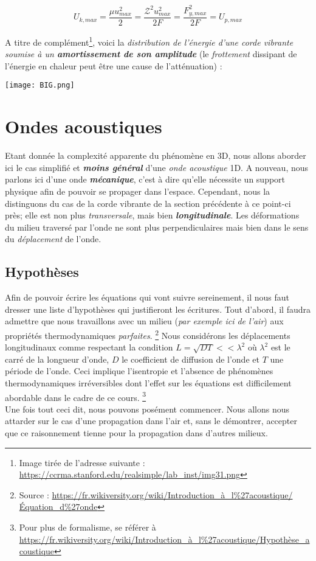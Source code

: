 \[ U_{k,max} = \frac{\mu u_{max}^{2}}{2} =   \frac{\mathcal{Z}^{2} u_{max}^{2}}{2F} = \frac{F_{y,max}^{2}}{2F} = U_{p,max}\]

A titre de complément\footnote{Image tirée de l'adresse suivante : \url{https://ccrma.stanford.edu/realsimple/lab_inst/img31.png}}, voici la \textit{distribution de l'énergie d'une corde vibrante soumise à un \textbf{amortissement de son amplitude}} (le \textit{frottement }dissipant de l'énergie en chaleur peut être une cause de l'atténuation) : 
\begin{center}
	\texttt{[image: BIG.png]}
\end{center}



\section{Ondes acoustiques}

Etant donnée la complexité apparente du phénomène en 3D, nous allons aborder ici le cas simplifié et \textit{\textbf{moins général}} d'une 
\textit{onde acoustique} 1D. A nouveau, nous parlons ici d'une onde \textit{\textbf{mécanique}}, c'est à dire qu'elle nécessite un support physique afin 
de pouvoir se propager dans l'espace. Cependant, nous la distinguons du cas de la corde vibrante de la section précédente à ce point-ci près; 
elle est non plus \textit{transversale}, mais bien \textit{\textbf{longitudinale}}. Les déformations du milieu traversé par l'onde ne sont plus perpendiculaires mais 
bien dans le sens du
\textit{déplacement}
de l'onde.

\subsection{Hypothèses}

Afin de pouvoir écrire les équations qui vont suivre sereinement, il nous faut dresser une liste d'hypothèses qui justifieront les écritures. 
Tout d'abord, il faudra admettre que nous travaillons avec un milieu (\textit{par exemple ici de l'air}) aux propriétés thermodynamiques \textit{parfaites}. \footnote{Source : \url{https://fr.wikiversity.org/wiki/Introduction_à_l\%27acoustique/Équation_d\%27onde}}
Nous considérons les déplacements longitudinaux comme respectant la condition $L = \sqrt{DT} << \lambda^{2}$ où $\lambda^{2}$ est le carré de la longueur d'onde, $D$ le coefficient de diffusion de l'onde et 
$T$ une période de l'onde. Ceci implique l'isentropie et l'absence de phénomènes thermodynamiques irréversibles dont l'effet sur les équations est difficilement abordable dans le cadre de ce cours. \footnote{Pour plus de formalisme, se référer à \url{https://fr.wikiversity.org/wiki/Introduction_à_l\%27acoustique/Hypothèse_acoustique}} \\ 
Une fois tout ceci dit, nous pouvons posément commencer. Nous allons nous attarder sur le cas d'une propagation dans l'air et, sans le démontrer, accepter que ce raisonnement tienne pour la propagation dans 
d'autres milieux.

